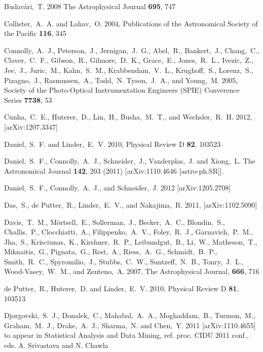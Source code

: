 \documentclass[useAMS,usenatbib,tightenlines,11pt,preprint]{aastex}
\begin{document}
\begin{thebibliography}{99}
Budav\'ari,~T. 2008 The Astrophysical Journal {\bf 695}, 747

Collister,~A.~A. and Lahav,~O. 2004,
Publications of the Astronomical Society of the Pacific {\bf 116}, 345

Connolly,~A.~J., Peterson,~J., Jernigan,~J.~G., Abel,~R., Bankert,~J.,
Chang,~C., Claver,~C.~F., Gibson,~R., Gilmore,~D.~K., Grace,~E., Jones,~R.~L.,
Ivezic,~Z., Jee,~J., Juric,~M., Kahn,~S.~M., Krabbendam,~V.~L., Krughoff,~S.,
Lorenz,~S., Pizagno,~J., Rasmussen,~A., Todd,~N. Tyson,~J.~A., and Young,~M.
2005, Society of the Photo-Optical Instrumentation Engineers (SPIE) Converence
Series {\bf 7738}, 53

Cunha,~C.~E., Huterer,~D., Lin,~H., Busha,~M.~T., and Wechsler,~R.~H. 2012,
[arXiv:1207.3347]

Daniel,~S.~F. and Linder,~E.~V. 2010, Physical Review D {\bf 82}, 103523

  Daniel,~S.~F., Connolly,~A.~J., Schneider,~J., Vanderplas,~J. and Xiong,~L. 
  The Astronomical Journal  {\bf 142}, 203 (2011)
  [arXiv:1110.4646 [astro-ph.SR]].

Daniel,~S.~F., Connolly,~A.~J., and Schneider,~J. 2012
[arXiv:1205.2708]

Das,~S., de Putter,~R., Linder,~E.~V., and Nakajima,~R. 2011,
[arXiv:1102.5090]

Davis,~T.~M., M\"ortsell,~E., Sollerman,~J., Becker,~A.~C., Blondin,~S.,
Challis,~P., Clocchiatti,~A., Filippenko,~A.~V., Foley,~R.~J., Garnavich,~P.~M.,
Jha,~S., Krisciunas,~K., Kirshner,~R.~P., Leibundgut,~B., Li,~W., Matheson,~T.,
Miknaitis,~G., Pignata,~G., Rest,~A., Riess,~A.~G., Schmidt,~B.~P.,
Smith,~R.~C., Spyromilio,~J., Stubbs,~C.~W., Suntzeff,~N.~B., Tonry,~J.~L.,
Wood-Vasey,~W.~M., and Zenteno,~A. 2007, The Astrophysical Journal, {\bf 666},
716

de Putter,~R., Huterer,~D. and Linder,~E.~V. 2010, Physical Review D {\bf 81},
103513


Djorgovski,~S.~J., Donalek,~C., Mahabal,~A.~A., Moghaddam,~B., Turmon,~M.,
Graham,~M.~J., Drake,~A.~J., Sharma,~N. and Chen,~Y. 2011
[arXiv:1110.4655] to appear in Statistical Analysis and Data Mining, ref. proc.
CIDU 2011 conf., eds. A. Srivastava and N. Chawla


\end{thebibliography}
\end{document}
